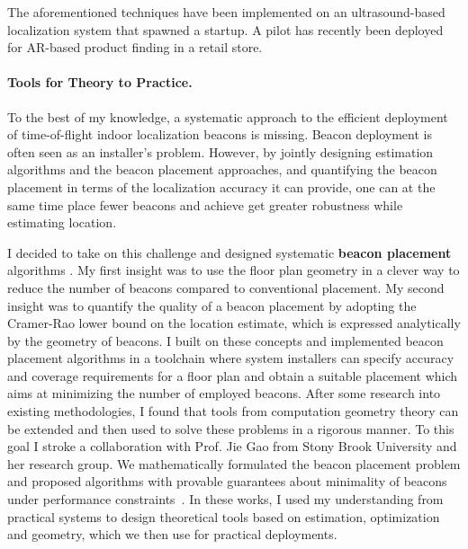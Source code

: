 \documentclass[10pt]{article}
\begin{document}
The aforementioned techniques have been implemented on an ultrasound-based localization system that spawned a startup. A pilot has recently been deployed for AR-based product finding in a retail store. 




\paragraph{Tools for Theory to Practice.  }
To the best of my knowledge, a systematic approach to the efficient deployment of time-of-flight indoor localization beacons is missing. 
Beacon deployment is often seen as an installer's problem. 
However, by jointly designing estimation algorithms and the beacon placement approaches, and quantifying the beacon placement in terms of the localization accuracy it can provide, one can at the same time place fewer beacons and achieve get greater robustness while estimating location.

I decided to take on this challenge and designed systematic {\bf beacon placement} algorithms \cite{rajagopal2016beacon}. 
My first insight was to use the floor plan geometry in a clever way to reduce the number of beacons compared to conventional placement. 
My second insight was to quantify the quality of a beacon placement by adopting the Cramer-Rao lower bound on the location estimate, which is expressed analytically by the geometry of beacons. I built on these concepts and implemented beacon placement algorithms in a toolchain where system installers can specify accuracy and coverage requirements for a floor plan and obtain a suitable placement which aims at minimizing the number of employed beacons.
After some research into existing methodologies, I found that tools from computation geometry theory can be extended and then used to solve these problems in a rigorous manner.  To this goal I stroke a collaboration with Prof. Jie Gao from Stony Brook University and her research group. We mathematically formulated the beacon placement problem and proposed algorithms with provable guarantees about minimality of beacons under performance constraints~\cite{beaconplacementtheory}.  In these works, I used my understanding from practical systems to design theoretical tools based on estimation, optimization and geometry, which we then use for practical deployments.
\end{document}
